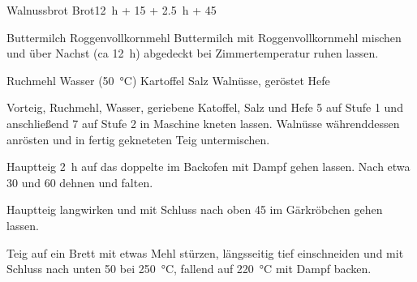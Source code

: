 \begin{MyRecipe}{Walnussbrot}{ Brot}{\SI{12}{\hour} + \SI{15}{\minuteprime} + \SI{2,5}{\hour} + \SI{45}{\minuteprime}}

	\ingredient[\Calc{325}{\x}]{\si{\gram}} {Buttermilch}
	\ingredient[\Calc{125}{\x}]{\si{\gram}} {Roggenvollkornmehl}
	Buttermilch mit Roggenvollkornmehl mischen und  über Nachst (ca \SI{12}{\hour}) abgedeckt bei Zimmertemperatur ruhen lassen.\par\bigskip

	\ingredient[\Calc{375}{\x}]{\si{\gram}} {Ruchmehl}
	\ingredient[\Calc{115}{\x}]{\si{\gram}} {Wasser (\SI{50}{\celsius})}
	\ingredient[\Calc{100}{\x}]{\si{\gram}} {Kartoffel}
	\ingredient[\Calc{10}{\x}]{\si{\gram}} {Salz}
	\ingredient[\Calc{100}{\x}]{\si{\gram}} {Walnüsse, geröstet}
	\ingredient[\Calc{5}{\x}]{\si{\gram}} {Hefe}

	Vorteig, Ruchmehl, Wasser, geriebene Katoffel, Salz und Hefe \SI{5}{\minuteprime} auf Stufe 1 und anschließend \SI{7}{\minuteprime} auf Stufe 2 in Maschine kneten lassen. Walnüsse währenddessen anrösten und in fertig gekneteten Teig untermischen.\par\bigskip
	
	Hauptteig \SI{2}{\hour} auf das doppelte im Backofen mit Dampf gehen lassen. Nach etwa \SI{30}{\minuteprime} und \SI{60}{\minuteprime} dehnen und falten.\par\bigskip
	
	Hauptteig langwirken und mit Schluss nach oben \SI{45}{\minuteprime} im Gärkröbchen gehen lassen.\par\bigskip

	Teig auf ein Brett mit etwas Mehl stürzen, längsseitig tief einschneiden und mit Schluss nach unten \SI{50}{\minuteprime} bei \SI{250}{\celsius}, fallend auf \SI{220}{\celsius} mit Dampf backen.\par\bigskip

\end{MyRecipe}
